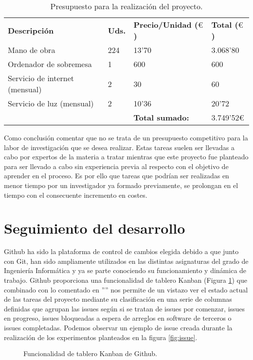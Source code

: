 \begin{table}[H]
    \begin{tabular}{llll}
    \rowcolor[HTML]{C0C0C0} 
    \textbf{Descripción}           & \textbf{Uds.} & \textbf{Precio/Unidad ($\euro$)} & \textbf{Total ($\euro$)} \\
    Mano de obra                   & 224           & 13'70                  & 3.068'80               \\
    Ordenador de sobremesa         & 1             & 600                    & 600                    \\
    Servicio de internet (mensual) & 2             & 30                     & 60                     \\
    Servicio de luz (mensual)      & 2             & 10'36                  & 20'72                  \\\hline
                                   &               & \textbf{Total sumado:} & 3.749'52$\euro$              
    \end{tabular}
    \caption{Presupuesto para la realización del proyecto.}
    \label{table:presupuesto}
\end{table}

Como conclusión comentar que no se trata de un presupuesto competitivo para la labor de investigación que se desea realizar. Estas tareas suelen 
ser llevadas a cabo por expertos de la materia a tratar mientras que este proyecto fue planteado para ser llevado a cabo sin experiencia previa al 
respecto con el objetivo de aprender en el proceso. Es por ello que tareas que podrían ser realizadas en menor tiempo por un investigador ya formado previamente, se prolongan 
en el tiempo con el consecuente incremento en costes.

\section{Seguimiento del desarrollo}
\label{seguimiento}
Github ha sido la plataforma de control de cambios elegida debido a que junto con Git, han sido ampliamente utilizados
en las distintas asignaturas del grado de Ingeniería Informática y ya se parte conociendo su funcionamiento y dinámica de 
trabajo. Github proporciona una funcionalidad de tablero Kanban (Figura \ref{fig:kanban}) que combinado con lo comentado en ''''
nos permite de un vistazo ver el estado actual de las tareas del proyecto mediante su clasificación en una serie de columnas 
definidas que agrupan las issues según si se tratan de issues por comenzar, issues en progreso, issues bloqueadas a espera 
de arreglos en software de terceros o issues completadas. Podemos observar un ejemplo de issue creada durante la realización de los 
experimentos planteados en la figura \ref{fig:issue}.
\begin{figure}[H]
    \caption{Funcionalidad de tablero Kanban de Github.}
    \label{fig:kanban}
\end{figure}

